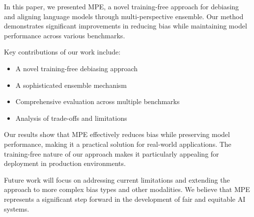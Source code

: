 In this paper, we presented MPE, a novel training-free approach for debiasing and aligning language models through multi-perspective ensemble. Our method demonstrates significant improvements in reducing bias while maintaining model performance across various benchmarks.

Key contributions of our work include:
\begin{itemize}
    \item A novel training-free debiasing approach
    \item A sophisticated ensemble mechanism
    \item Comprehensive evaluation across multiple benchmarks
    \item Analysis of trade-offs and limitations
\end{itemize}

Our results show that MPE effectively reduces bias while preserving model performance, making it a practical solution for real-world applications. The training-free nature of our approach makes it particularly appealing for deployment in production environments.

Future work will focus on addressing current limitations and extending the approach to more complex bias types and other modalities. We believe that MPE represents a significant step forward in the development of fair and equitable AI systems. 